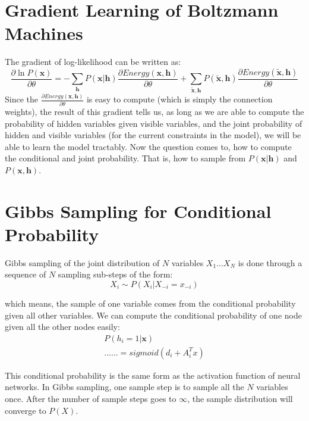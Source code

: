 \documentclass[11pt,fleqn, UTF8]{ctexbook} %
\begin{document}
\section{Gradient Learning of Boltzmann Machines}
The gradient of log-likelihood can be written as:
\begin{equation}\label{LLG}
  \frac{\partial \ln P(\boldsymbol{x})}{\partial \theta}=-\sum_{\boldsymbol{h}}P(\boldsymbol{x}\vert \boldsymbol{h})\frac{\partial Energy(\boldsymbol{x},\boldsymbol{h})}{\partial \theta} + \sum_{\tilde{\boldsymbol{x}},\boldsymbol{h}} P(\tilde{\boldsymbol{x}}, \boldsymbol{h})\frac{\partial Energy(\tilde{\boldsymbol{x}}, \boldsymbol{h})}{\partial \theta}
\end{equation}
Since the $\frac{\partial Energy(\boldsymbol{x},\boldsymbol{h})}{\partial \theta}$ is easy to compute (which is simply the connection weights), the result of this gradient tells us, as long as we are able to compute the probability of hidden variables given visible variables, and the joint probability of hidden and visible variables (for the current constraints in the model), we will be able to learn the model tractably. Now the question comes to, how to compute the conditional and joint probability. That is, how to sample from $P(\boldsymbol{x}\vert \boldsymbol{h})$ and $P(\boldsymbol{x},\boldsymbol{h})$.

\section{Gibbs Sampling for Conditional Probability}
Gibbs sampling of the joint distribution of $N$ variables $X_{1}...X_{N}$ is done through a sequence of $N$ sampling sub-steps of the form:
\begin{equation*}
  X_{i}\sim P(X_{i}|X_{-i}=x_{-i})
\end{equation*}

which means, the sample of one variable comes from the conditional probability given all other variables. We can compute the conditional probability of one node given all the other nodes easily:
\begin{gather*}
  P(h_i=1 \vert \boldsymbol{x}) \\
  ......=sigmoid(d_i+A^T_ix)
\end{gather*}

This conditional probability is the same form as the activation function of neural networks. In Gibbs sampling, one sample step is to sample all the $N$ variables once. After the number of sample steps goes to $\infty$, the sample distribution will converge to $P(X)$.
\end{document}

